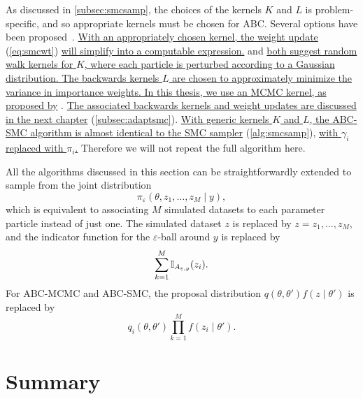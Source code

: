 As discussed in \cref{subsec:smcsamp}, the choices of the kernels $K$ and $L$
is problem-specific, and so appropriate kernels must be chosen for \gls{ABC}.
Several options have been proposed~\autocite{beaumont2009adaptive,
sisson2007sequential, del2012adaptive}. {\color{blue}\uline{With an
appropriately chosen kernel, the weight update} (\cref{eq:smcwt}) \uline{will
simplify into a computable expression.} \textcite{sisson2007sequential} and
\textcite{beaumont2009adaptive} \uline{both suggest random walk kernels for
$K$, where each particle is
perturbed according to a Gaussian distribution. The backwards kernels $L$ are
chosen to approximately minimize the variance in importance weights. In this
thesis, we use an \gls{MCMC} kernel, as proposed by} \textcite{del2012adaptive}.
\uline{The associated backwards kernels and weight updates are discussed in the
next chapter} (\cref{subsec:adaptsmc}). \uline{With generic kernels $K$ and
$L$, the \gls{ABC}-\gls{SMC} algorithm is almost identical to the \gls{SMC}
sampler} (\cref{alg:smcsamp}), \uline{with $\gamma_i$ replaced with $\pi_i$.}
Therefore we will not repeat the full algorithm here.}

All the algorithms discussed in this section can be straightforwardly extended
to sample from the joint distribution
\[
  \pi_\varepsilon(\theta, z_1, \ldots, z_M \mid y),
\]
which is equivalent to associating $M$ simulated datasets to each parameter
particle instead of just one. The simulated dataset $z$ is replaced by
$z = z_1, \ldots, z_M$, and the indicator function for the
$\varepsilon$-ball around $y$ is replaced by
\[
  \sum_{k=1}^M \mathbb{I}_{A_{\varepsilon, y}} (z_i).
\]
For \gls{ABC}-\gls{MCMC} and \gls{ABC}-\gls{SMC}, the proposal distribution
$q(\theta, \theta') f(z \mid \theta')$ is replaced by
\[
  q_i(\theta, \theta') \prod_{k=1}^M f(z_i \mid \theta').
\]

\section{Summary}


